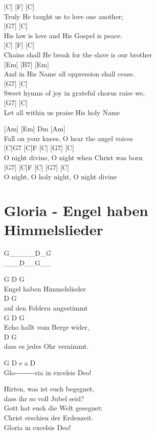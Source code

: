 \documentclass[
  letterpaper,
]{scrbook}
\begin{document}
{[}C{]} {[}F{]} {[}C{]}\\
Truly He taught us to love one another;\\
{[}G7{]} {[}C{]}\\
His law is love and His Gospel is peace.\\
{[}C{]} {[}F{]} {[}C{]}\\
Chains shall He break for the slave is our brother\\
{[}Em{]} {[}B7{]} {[}Em{]}\\
And in His Name all oppression shall cease.\\
{[}G7{]} {[}C{]}\\
Sweet hymns of joy in grateful chorus raise we,\\
{[}G7{]} {[}C{]}\\
Let all within us praise His holy Name

{[}Am{]} {[}Em{]} Dm {[}Am{]}\\
Fall on your knees, O hear the angel voices\\
{[}C{]}G7 {[}C{]}F {[}C{]} {[}G7{]} {[}C{]}\\
O night divine, O night when Christ was born\\
{[}G7{]} {[}C{]}F {[}C{]} {[}G7{]} {[}C{]}\\
O night, O holy night, O night divine

\hypertarget{gloria---engel-haben-himmelslieder}{%
\chapter{Gloria - Engel haben
Himmelslieder}\label{gloria---engel-haben-himmelslieder}}

\textbar G\_\_\_\_\_\textbar D\_\emph{G\textbf{\textbar{}\\
\textbar{}}}\_\_\_\textbar D\_\_G\_\_\textbar{}

G D G\\
Engel haben Himmelslieder\\
D G\\
auf den Feldern angestimmt\\
G D G\\
Echo hallt vom Berge wider,\\
D G\\
dass es jedes Ohr vernimmt.

G D e a D\\
Glo-\/-\/-\/-\/-\/-\/-\/-\/-ria in excelsis Deo!

Hirten, was ist euch begegnet,\\
dass ihr so voll Jubel seid?\\
Gott hat euch die Welt gesegnet:\\
Christ erschien der Erdenzeit.\\
Gloria in excelsis Deo!
\end{document}
